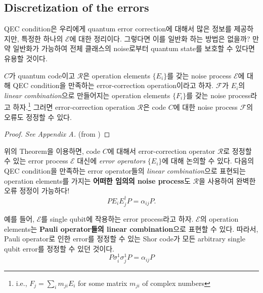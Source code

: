 \subsection{Discretization of the errors}
QEC condition은 우리에게 quantum error correction에 대해서 많은 정보를 제공하지만, 특정한 하나의 $\mathcal E$에 대한 정리이다. 그렇다면 이를 일반화 하는 방법은 없을까? 만약 일반화가 가능하여 전체 클래스의 noise로부터 quantum state를 보호할 수 있다면 유용할 것이다. 
\begin{theorem}\label{thm:linear-QEC}
    $C$가 quantum code이고 $\mathcal{R}$은 operation elements $\{E_i\}$를 갖는 noise process $\mathcal E$에 대해 QEC condition을 만족하는 error-correction operation이라고 하자. $\mathcal F$가 $E_i$의 \textit{linear combination}으로 만들어지는 operation elements $\{F_i\}$를 갖는 noise process라고 하자.\footnote{i.e., $F_j = \sum_i m_{ji} E_i$ for some matrix $m_{ji}$ of complex numbers} 그러면 error-correction operation $\mathcal R$은 code $C$에 대한 noise process $\mathcal F$의 오류도 정정할 수 있다.
\end{theorem}
\begin{proof}
    \textit{See Appendix A.} (from \cite{nielsen2001quantum})
\end{proof}

위의 Theorem을 이용하면, code $C$에 대해서 error-correction operator $\mathcal R$로 정정할 수 있는 error process $\mathcal E$ 대신에 \textit{error operators} $\{E_i\}$에 대해 논의할 수 있다. 다음의 QEC condition을 만족하는 error operator들의 \textit{linear combination}으로 표현되는 operation elements를 가지는 \textbf{어떠한 임의의 noise process}도 $\mathcal R$을 사용하여 완벽한 오류 정정이 가능하다!
\begin{equation*}
    P E_i E_j^{\dagger} P=\alpha_{i j} P .
\end{equation*}

예를 들어, $\mathcal E$를 single qubit에 작용하는 error process라고 하자. $\mathcal E$의 operation elements는 \textbf{Pauli operator들의 linear combination}으로 표현할 수 있다. 따라서, Pauli operator로 인한 error를 정정할 수 있는 Shor code가 모든 arbitrary single qubit error를 정정할 수 있던 것이다.
\begin{equation*}
    P \sigma_i^1 \sigma_j^1 P=\alpha_{i j} P
\end{equation*}

